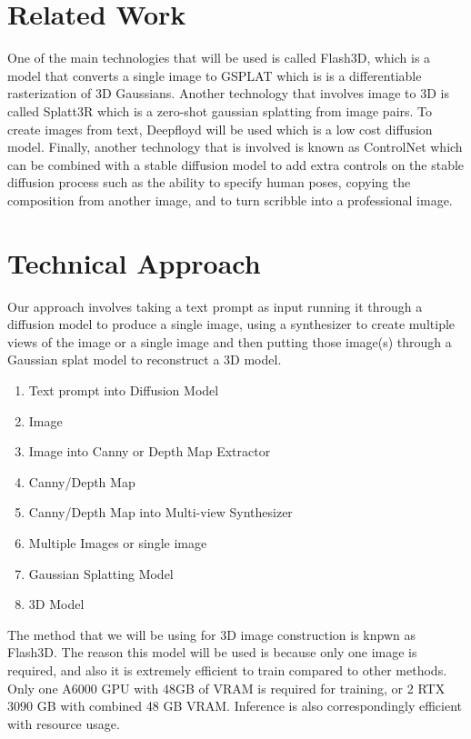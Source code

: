 \documentclass[10pt,twocolumn,letterpaper]{article}
\begin{document}
\section{Related Work}

One of the main technologies that will be used is called Flash3D, which  is a model that converts a single image to GSPLAT which is is a differentiable rasterization of 3D Gaussians. Another technology that involves image to 3D is called Splatt3R which is a zero-shot gaussian splatting from image pairs. To create images from text, Deepfloyd will be used which is a low cost diffusion model. Finally, another technology that is involved is known as ControlNet which can be combined with a stable diffusion model to add extra controls on the stable diffusion process such as the ability to specify human poses, copying the composition from another image, and to turn scribble into a professional image.


\section{Technical Approach}


Our approach involves taking a text prompt as input running it through a diffusion model to produce a single image, using a synthesizer to create multiple views of the image or a single image and then putting those image(s) through a Gaussian splat model to reconstruct a 3D model.

\begin{enumerate}
\item Text prompt into Diffusion Model
\item Image
\item Image into Canny or Depth Map Extractor
\item Canny/Depth Map
\item Canny/Depth Map into Multi-view Synthesizer
\item Multiple Images or single image
\item Gaussian Splatting Model
\item 3D Model
\end{enumerate}

The method that we will be using for 3D image construction is knpwn as Flash3D. The reason this model will be used is because only one image is required, and also it is extremely efficient to train compared to other methods. Only one A6000 GPU with 48GB of VRAM is required for training, or 2 RTX 3090 GB with combined 48 GB VRAM. Inference is also correspondingly efficient with resource usage.
\end{document}
